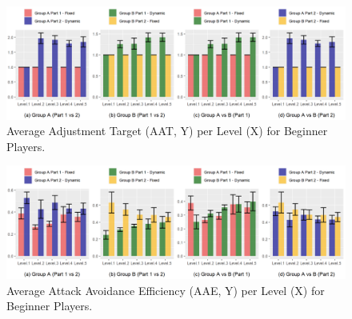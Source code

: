 

\begin{figure}[!ht]
    \caption{Average Adjustment Target (AAT, Y) per Level (X) for Beginner Players.}
    \begin{center}
        \includegraphics[width=34em]{figures/adjustment_target_level-beginner_players.png}
    \end{center}
    \label{fig:result-metric-beginners-adjustment-target-level}
\end{figure}

\begin{figure}[!ht]
    \caption{Average Attack Avoidance Efficiency (AAE, Y) per Level (X) for Beginner Players.}
    \begin{center}
        \includegraphics[width=34em]{figures/attack_avoidance_efficiency-beginner_players.png}
    \end{center}
    \label{fig:result-metric-beginners-attack-avoidance-efficiency}
\end{figure}

